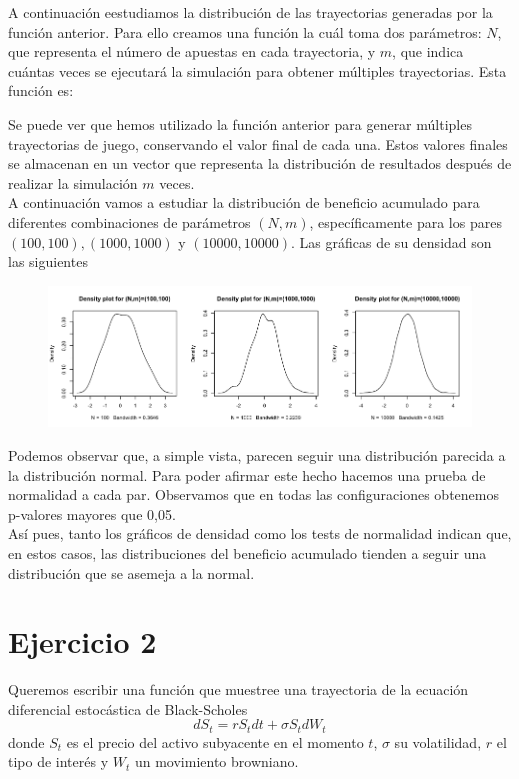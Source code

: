 \documentclass[a4paper,]{article}
\begin{document}
A continuación eestudiamos la distribución de las trayectorias generadas por la función anterior. Para ello creamos una función la cuál toma dos parámetros: $N$, que representa el número de apuestas en cada trayectoria, y $m$, que indica cuántas veces se ejecutará la simulación para obtener múltiples trayectorias. Esta función es:
\vspace{1cm}

Se puede ver que hemos utilizado la función anterior para generar múltiples trayectorias de juego, conservando el valor final de cada una. Estos valores finales se almacenan en un vector que representa la distribución de resultados después de realizar la simulación $m$ veces.\\

A continuación vamos a estudiar la distribución de beneficio acumulado para diferentes combinaciones de parámetros $(N, m)$, específicamente para los pares $(100,100), (1000,1000)$ y $(10000,10000)$. Las gráficas de su densidad son las siguientes
\begin{figure}[H]
    \centering
    \includegraphics[width=1\linewidth]{plot3.png}  
\end{figure}
Podemos observar que, a simple vista, parecen seguir una distribución parecida a la distribución normal. Para poder afirmar este hecho hacemos una prueba de normalidad a cada par. Observamos que en todas las configuraciones obtenemos p-valores mayores que 0,05. \\

Así pues, tanto los gráficos de densidad como los tests de normalidad indican que, en estos casos, las distribuciones del beneficio acumulado tienden a seguir una distribución que se asemeja a la normal. \\

\section*{Ejercicio 2}

Queremos escribir una función que muestree una trayectoria de la ecuación diferencial estocástica de Black-Scholes
$$dS_t=rS_tdt+\sigma S_tdW_t$$
donde $S_t$ es el precio del activo subyacente en el momento $t$, $\sigma$ su volatilidad, $r$ el tipo de interés y $W_t$ un movimiento browniano. \\
\end{document}
